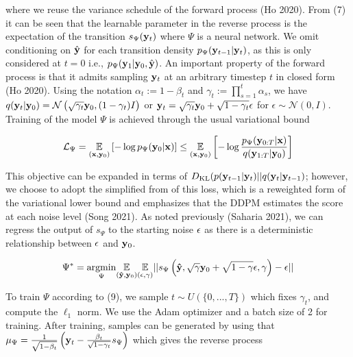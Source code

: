 \documentclass{article}
\begin{document}
where we reuse the variance schedule of the forward process (Ho 2020). From (7) it can be seen that the learnable parameter in the reverse process is the expectation of the transition $s_{\Psi}(\bold{y}_{t})$ where $\Psi$ is a neural network. We omit conditioning on $\hat{\bold{y}}$ for each transition density $p_{\Psi}(\bold{y}_{t-1}|\bold{y}_{t})$, as this is only considered at $t=0$ i.e., $p_{\Psi}(\bold{y}_{1}|\bold{y}_{0},\hat{\bold{y}})$. An important property of the forward process is that it admits sampling $\bold{y}_t$ at an arbitrary timestep $t$ in closed form (Ho 2020). Using the notation $\alpha_t := 1 - \beta_t$ and $\gamma_t := \prod_{s=1}^{t} \alpha_s$, we have $q(\bold{y}_t|\bold{y}_0) = \mathcal{N} \left(\sqrt{\gamma_{t}} \bold{y}_{0}, (1 - \gamma_t)I \right)$ or $\bold{y}_{t} = \sqrt{\gamma_{t}}\bold{y}_{0} + \sqrt{1-\gamma_{t}}\bold{\epsilon}$ for $\epsilon \sim \mathcal{N}(0,I)$. Training of the model $\Psi$ is achieved through the usual variational bound

\begin{equation}
\mathcal{L}_{\Psi} = \underset{(\bold{x},\bold{y}_{0})}{\mathbb{E}}\left[-\log p_{\Psi}(\bold{y}_{0}|\bold{x})\right] \leq  \underset{(\bold{x},\bold{y}_{0})}{\mathbb{E}}\left[-\log \frac{p_{\Psi}(\bold{y}_{0:T}|\bold{x})}{q(\bold{y}_{1:T}|\bold{y}_{0})}\right]
\end{equation}

This objective can be expanded in terms of $D_{\mathrm{KL}}(p(\bold{y}_{t-1}|\bold{y}_{t})|| q(\bold{y}_{t}|\bold{y}_{t-1})$; however, we choose to adopt the simplified from of this loss, which is a reweighted form of the variational lower bound and emphasizes that the DDPM estimates the score at each noise level (Song 2021). As noted previously (Saharia 2021), we can regress the output of $s_{\Psi}$ to the starting noise $\bold{\epsilon}$ as there is a deterministic relationship between $\bold{\epsilon}$ and $\bold{y}_{0}$.

\begin{equation}
\Psi^{*} = \underset{\Psi}{\mathrm{argmin}} \underset{(\bold{\hat{y}},\bold{y}_{0})}{\mathbb{E}}\underset{(\epsilon,\gamma)}{\mathbb{E}} \lvert\lvert s_{\Psi}\left(\bold{\hat{y}}, \sqrt{\gamma} \bold{y}_0 + \sqrt{1 - \gamma} \epsilon, \gamma\right) - \epsilon \lvert\lvert
\end{equation}

To train $\Psi$ according to (9), we sample $t\sim U(\{0,...,T\})$ which fixes $\gamma_{t}$, and compute the $\ell_{1}$ norm. We use the Adam optimizer and a batch size of 2 for training. After training, samples can be generated by using that $\mu_{\Psi} = \frac{1}{\sqrt{1-\beta_{t}}}\left(\bold{y}_{t} - \frac{\beta_{t}}{\sqrt{1-\gamma_{t}}}s_{\Psi}\right)$ which gives the reverse process
\end{document}

